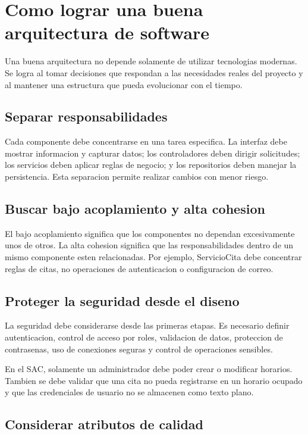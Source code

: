 \documentclass[12pt,letterpaper]{article}
\begin{document}
\section{Como lograr una buena arquitectura de software}

Una buena arquitectura no depende solamente de utilizar tecnologias modernas. Se logra al tomar decisiones que respondan a las necesidades reales del proyecto y al mantener una estructura que pueda evolucionar con el tiempo.

\subsection{Separar responsabilidades}

Cada componente debe concentrarse en una tarea especifica. La interfaz debe mostrar informacion y capturar datos; los controladores deben dirigir solicitudes; los servicios deben aplicar reglas de negocio; y los repositorios deben manejar la persistencia. Esta separacion permite realizar cambios con menor riesgo.

\subsection{Buscar bajo acoplamiento y alta cohesion}

El bajo acoplamiento significa que los componentes no dependan excesivamente unos de otros. La alta cohesion significa que las responsabilidades dentro de un mismo componente esten relacionadas. Por ejemplo, ServicioCita debe concentrar reglas de citas, no operaciones de autenticacion o configuracion de correo.

\subsection{Proteger la seguridad desde el diseno}

La seguridad debe considerarse desde las primeras etapas. Es necesario definir autenticacion, control de acceso por roles, validacion de datos, proteccion de contrasenas, uso de conexiones seguras y control de operaciones sensibles.

En el SAC, solamente un administrador debe poder crear o modificar horarios. Tambien se debe validar que una cita no pueda registrarse en un horario ocupado y que las credenciales de usuario no se almacenen como texto plano.

\subsection{Considerar atributos de calidad}
\end{document}
